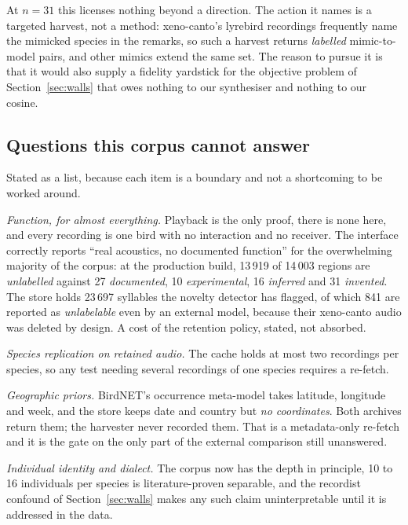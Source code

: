 \documentclass[10pt,twocolumn,a4paper]{article}
\begin{document}
At $n = 31$ this licenses nothing beyond a direction. The action it names is a targeted
harvest, not a method: xeno-canto's lyrebird recordings frequently name the mimicked
species in the remarks, so such a harvest returns \emph{labelled} mimic-to-model pairs, and
other mimics extend the same set. The reason to pursue it is that it would also supply a
fidelity yardstick for the objective problem of Section~\ref{sec:walls} that owes nothing to
our synthesiser and nothing to our cosine.

\subsection{Questions this corpus cannot answer}

Stated as a list, because each item is a boundary and not a shortcoming to be worked
around.

\emph{Function, for almost everything.} Playback is the only proof, there is none here, and
every recording is one bird with no interaction and no receiver. The interface correctly
reports ``real acoustics, no documented function'' for the overwhelming majority of the
corpus: at the production build, 13\,919 of 14\,003 regions are \emph{unlabelled} against 27
\emph{documented}, 10 \emph{experimental}, 16 \emph{inferred} and 31 \emph{invented}. The
store holds 23\,697 syllables the novelty detector has flagged, of which 841 are reported as
\emph{unlabelable} even by an external model, because their xeno-canto audio was deleted by
design. A cost of the retention policy, stated, not absorbed.

\emph{Species replication on retained audio.} The cache holds at most two recordings per
species, so any test needing several recordings of one species requires a re-fetch.

\emph{Geographic priors.} BirdNET's occurrence meta-model takes latitude, longitude and week,
and the store keeps date and country but \emph{no coordinates}. Both archives return them; the
harvester never recorded them. That is a metadata-only re-fetch and it is the gate on the only
part of the external comparison still unanswered.

\emph{Individual identity and dialect.} The corpus now has the depth in principle, 10 to 16
individuals per species is literature-proven separable, and the recordist confound of
Section~\ref{sec:walls} makes any such claim uninterpretable until it is addressed in the data.
\end{document}
